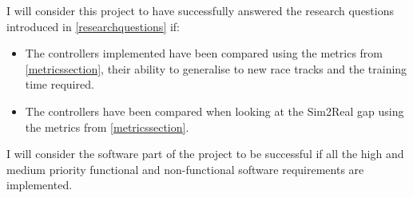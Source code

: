 I will consider this project to have successfully answered the research questions introduced in \ref{researchquestions} if:
\begin{itemize}
	\item The controllers implemented have been compared using the metrics from \ref{metricssection}, their ability to generalise to new race tracks and the training time required.
	\item The controllers have been compared when looking at the Sim2Real gap using the metrics from \ref{metricssection}.
\end{itemize}

I will consider the software part of the project to be successful if all the high and medium priority functional and non-functional software requirements are implemented.

